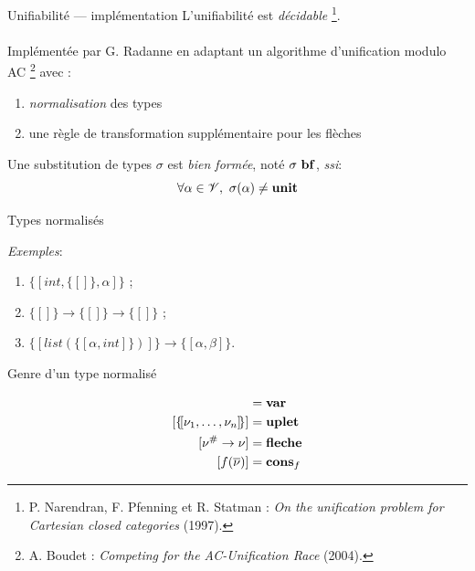 \documentclass[serif]{beamer}
\newcommand{\exemples}{\textit{Exemples}\xspace}
\newcommand{\mset}[1]{\{\![#1]\!\}}
\newcommand{\ssi}{\textit{ssi}\xspace}
\newcommand{\unit}{\bold{unit}}
\newcommand{\V}{\mathscr{V}}
\newcommand{\F}{\mathscr{F}}
\newcommand{\G}{\mathscr{G}}
\newcommand{\N}{\mathrm{N}}
\begin{document}

\begin{frame}{Unifiabilité — implémentation}
\small
L'unifiabilité est \emph{décidable} \footnote{P. Narendran, F. Pfenning et R. Statman : \textit{On the unification problem for Cartesian closed categories} (1997).}.
\\~\\
Implémentée par G. Radanne en adaptant un algorithme d'unification modulo AC \footnote{A. Boudet : \textit{Competing for the AC-Unification Race} (2004).} avec :
\begin{enumerate}
	\item \emph{normalisation} des types
	\item une règle de transformation supplémentaire pour les flèches
\end{enumerate}
\bigskip
Une substitution de types $\sigma$ est \emph{bien formée}, noté $\sigma\ \bold{bf}$, \ssi :
	\[ \forall \alpha \in \V,\ \sigma (\alpha) \neq \unit \]
\end{frame}


\begin{frame}{Types normalisés}
\exemples :
\begin{enumerate}
	\item $\mset{int, \mset{}, \alpha}$ ;
	\item $\mset{} \rightarrow \mset{} \rightarrow \mset{}$ ;
	\item $\mset{list (\mset{\alpha, int})} \rightarrow \mset{\alpha, \beta}$.
\end{enumerate}
\end{frame}


\begin{frame}{Genre d'un type normalisé}
\small
{}
\begin{align*}
		[ \alpha ] &= \bold{var}
	\\
		[ \mset{\nu_1, \dots, \nu_n} ] &= \bold{uplet}
	\\
		[ \nu^\# \rightarrow \nu ] &= \bold{fleche}
	\\
		[ f (\overline \nu) ] &= \bold{cons}_f
\end{align*}
\end{frame}
\end{document}

